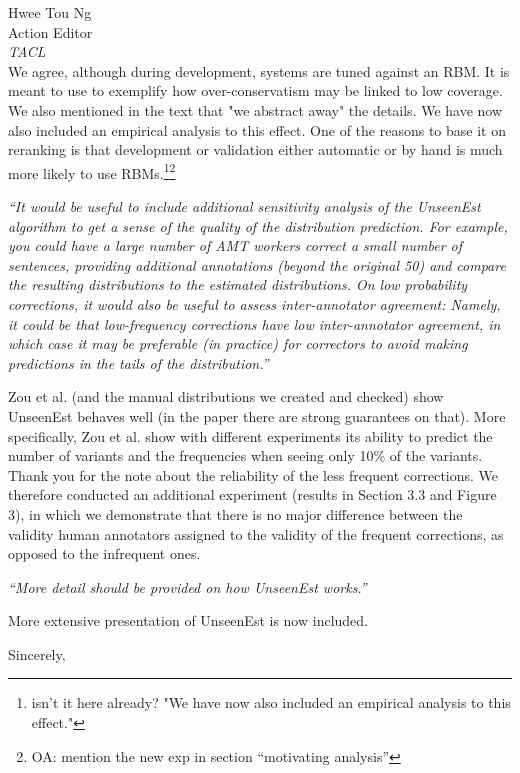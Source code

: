 \documentclass[11pt,letterpaper]{letter}
\newcommand{\oa}[1]{\footnote{\color{red}OA: #1}}
\begin{document}
\begin{letter}{%
Hwee Tou Ng\\
Action Editor\\
{\em TACL}\\
}
	We agree, although during development, systems are tuned against an RBM. It is meant to use to exemplify how over-conservatism may be linked to low coverage. We also mentioned in the text that "we abstract away" the details. We have now also included an empirical analysis to this effect. One of the reasons to base it on reranking is that development or validation either automatic or by hand is much more likely to use RBMs.\footnote{isn't it here already? "We have now also included an empirical analysis to this effect."}\oa{mention the new exp in section ``motivating analysis''}
	
	\emph{``It would be useful to include additional sensitivity analysis of the
		UnseenEst algorithm to get a sense of the quality of the distribution
		prediction. For example, you could have a large number of AMT workers
		correct a small number of sentences, providing additional annotations
		(beyond the original 50) and compare the resulting distributions to the
		estimated distributions. On low probability corrections, it would also be
		useful to assess inter-annotator agreement: Namely, it could be that
		low-frequency corrections have low inter-annotator agreement, in which case
		it may be preferable (in practice) for correctors to avoid making
		predictions in the tails of the distribution.''
		}
		
Zou et al. (and the manual distributions we created and checked) show UnseenEst behaves well (in the paper there are strong guarantees on that). More specifically, Zou et al. show with different experiments its ability to predict the number of variants and the frequencies when seeing only 10\% of the variants. 
Thank you for the note about the reliability of the less frequent corrections. We therefore conducted an additional experiment (results in Section 3.3 and Figure 3), in which we demonstrate that there is no major difference between the validity human annotators assigned to the validity of the frequent corrections, as opposed to the infrequent ones.
		
\emph{``More detail should be provided on how UnseenEst works.''}
		
More extensive presentation of UnseenEst is now included. 

\closing{Sincerely,}

\end{letter}
\end{document}
